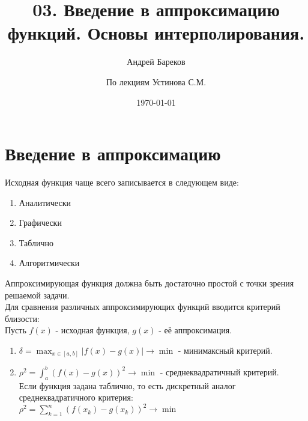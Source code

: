 \documentclass[a4paper,11pt]{article}
\title{03. Введение в аппроксимацию функций. Основы интерполирования.}
\author{Андрей Бареков \and По лекциям Устинова С.М.}
\date{\today}
\begin{document}
\maketitle
\newpage

\section{Введение в аппроксимацию}
Исходная функция чаще всего записывается в следующем виде:
\begin{enumerate}
  \item Аналитически
  \item Графически
  \item Таблично
  \item Алгоритмически
\end{enumerate}
Аппроксимирующая функция должна быть достаточно простой с точки зрения решаемой задачи. \\
Для сравнения различных аппроксимирующих функций вводится критерий близости: \\
Пусть $f(x)$ - исходная функция, $g(x)$ - её аппроксимация.
\begin{enumerate}
  \item \(\delta = \max_{x \in [a,b]} |f(x) - g(x)| \to \min\) - минимаксный критерий.
  \item \(\rho^2 = \int_{a}^{b} (f(x) - g(x))^2 \to \min\) - среднеквадратичный критерий. \\
        Если функция задана таблично, то есть дискретный аналог среднеквадратичного критерия: \\
        \(\rho^2 = \sum_{k=1}^{n} (f(x_k) - g(x_k))^2 \to \min\)
\end{enumerate}
\end{document}
